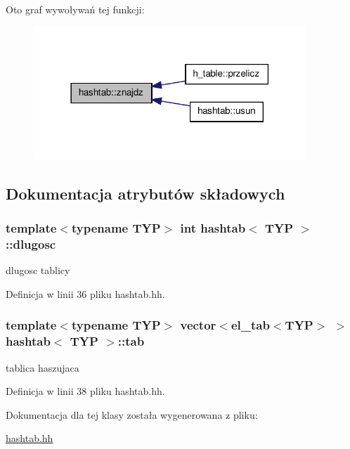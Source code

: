 \-Oto graf wywoływań tej funkcji\-:\nopagebreak
\begin{figure}[H]
\begin{center}
\leavevmode
\includegraphics[width=290pt]{classhashtab_af6452a7dbb4a30870ec16635b859f18c_icgraph}
\end{center}
\end{figure}




\subsection{\-Dokumentacja atrybutów składowych}
\hypertarget{classhashtab_a1c0fe6f05d425274c58352e21cc7f496}{
\subsubsection[{dlugosc}]{\setlength{\rightskip}{0pt plus 5cm}template$<$typename \-T\-Y\-P$>$ int {\bf hashtab}$<$ \-T\-Y\-P $>$\-::{\bf dlugosc}}}\label{classhashtab_a1c0fe6f05d425274c58352e21cc7f496}


dlugosc tablicy 



\-Definicja w linii 36 pliku hashtab.\-hh.

\hypertarget{classhashtab_ab7d4d7c920e89fae8a292772dc9d7611}{
\subsubsection[{tab}]{\setlength{\rightskip}{0pt plus 5cm}template$<$typename \-T\-Y\-P$>$ vector$<${\bf el\-\_\-tab}$<$\-T\-Y\-P$>$ $>$ {\bf hashtab}$<$ \-T\-Y\-P $>$\-::{\bf tab}}}\label{classhashtab_ab7d4d7c920e89fae8a292772dc9d7611}


tablica haszujaca 



\-Definicja w linii 38 pliku hashtab.\-hh.



\-Dokumentacja dla tej klasy została wygenerowana z pliku\-:\begin{DoxyCompactItemize}
\item 
\hyperlink{hashtab_8hh}{hashtab.\-hh}\end{DoxyCompactItemize}
